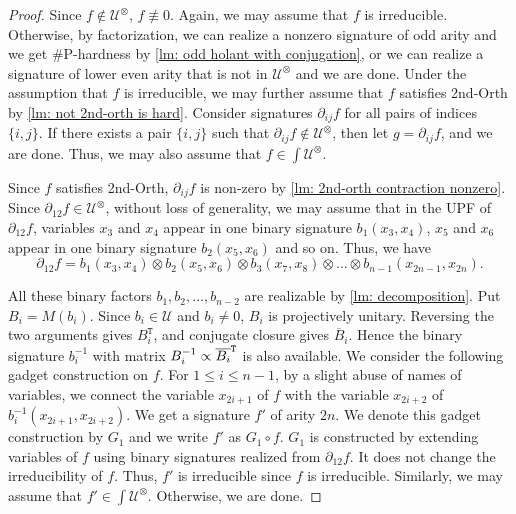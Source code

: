 \begin{proof}
Since ${f}\notin {\mathcal{U}}^{\otimes}$, $ f\not\equiv 0$.
Again, we may assume that ${f}$ is irreducible.
Otherwise, by factorization, we can realize a nonzero signature of odd arity and we get \#P-hardness by \cref{lm: odd holant with conjugation}, or we can realize a signature of lower even arity that is not in $\mathcal{U}^{\otimes}$ and we are done.
Under the assumption that $f$ is irreducible, we may further assume that $f$ satisfies {\sc 2nd-Orth} by \cref{lm: not 2nd-orth is hard}.
Consider signatures ${\partial}_{ij}{f}$ for all pairs of indices $\{i, j\}$. 
If there exists a pair $\{i, j\}$ such that ${\partial}_{ij}{f}\notin {\mathcal{U}}^{\otimes}$, then let ${g}={\partial}_{ij}{f}$, and we are done.
Thus, we may also assume that ${f}\in {\int}{\mathcal{U}}^{\otimes}$.  

Since $f$ satisfies {\sc 2nd-Orth}, $\partial_{ij}f$ is non-zero by \cref{lm: 2nd-orth contraction nonzero}.
Since $ {\partial}_{12} {f} \in  {\mathcal{U}}^{\otimes}$, without loss of generality, we may assume that in the UPF of $ {\partial}_{12} {f}$, variables $x_3$ and $x_4$ appear in one  binary signature $b_1(x_3, x_4)$, $x_5$ and $x_6$ appear in one binary signature $b_2(x_5, x_6)$ and so on. 
Thus, we have 
\begin{equation*}
 {\partial}_{12} {f}=   {b_1}(x_3, x_4)\otimes  {b_2}(x_5, x_6)\otimes {b_3}(x_7, x_8)\otimes \ldots \otimes  {b_{n-1}}(x_{2n-1}, x_{2n}).
\end{equation*}

All these binary factors $b_1,b_2,\ldots,b_{n-2}$ are realizable by
\cref{lm: decomposition}.  
Put $B_i=M(b_i)$.  
Since
$b_i\in\mathcal U$ and $b_i\neq 0$, $B_i$ is projectively unitary.  Reversing the two arguments gives $B_i^{\mathtt T}$, and conjugate closure gives
$\overline B_i$.  
Hence the binary signature $b_i^{-1}$ with matrix $B_i^{-1}\propto \overline{B_i}^{\tt T}$ is also available.
We consider the following gadget construction on $f$.
For $1\leqslant i\leqslant n-1$, by a slight abuse of names of variables, we connect the variable $x_{2i+1}$ of $f$   
with the variable $x_{2i+2}$ of $  {b^{-1}_{i}}(x_{2i+1}, x_{2i+2})$. 
We get a signature $f'$ of arity $2n$. 
We denote this gadget construction by $G_1$ and we write $f'$ as $G_1 \circ f$.
$G_1$ is constructed by extending variables of $f$ using binary signatures realized from ${\partial}_{12}{f}$. 
It does not change the irreducibility of $f$.  
Thus, $f'$ is irreducible since $f$ is irreducible.
Similarly, we may assume that $f'\in {\int}  {\mathcal{U}}^{\otimes}$. Otherwise, we are done.



\end{proof}
